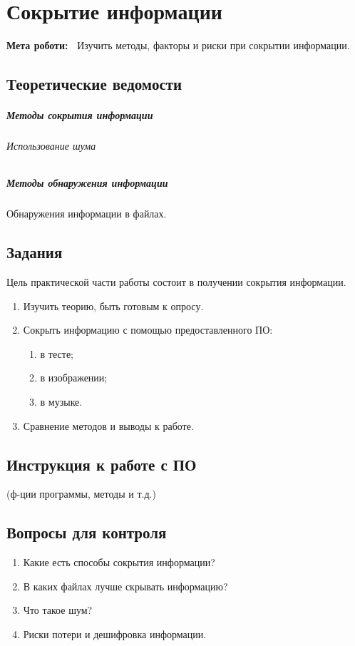 \chapter{Сокрытие информации} \label{chapt7}%
\textbf{Мета роботи:~}%
Изучить методы, факторы и риски при сокрытии информации.
\section{Теоретические ведомости} \label{sect6_a}
%
\paragraph{Методы сокрытия информации}

\subparagraph{Использование шума}

\paragraph{Методы обнаружения информации}
 Обнаружения информации в файлах.

\section{Задания}\label{sect6_b}
Цель практической части работы состоит в получении 
сокрытия информации.
%
\begin{enumerate}
  \item Изучить теорию, быть готовым к опросу.
  \item Сокрыть информацию с помощью предоставленного ПО: %
  \begin{enumerate}
    \item в тесте;
    \item в изображении;
    \item в музыке.
  \end{enumerate}
  \item Сравнение методов и выводы к работе.
\end{enumerate}
\section{Инструкция к работе с ПО}\label{sect6_c}
%
(ф-ции программы, методы и т.д.)
\section{Вопросы для контроля}\label{sect6_e}
%
\begin{enumerate}
  \item Какие есть способы сокрытия информации?
  \item В каких файлах лучше скрывать информацию?
  \item Что такое шум?
  \item Риски потери и дешифровка информации.
\end{enumerate}
